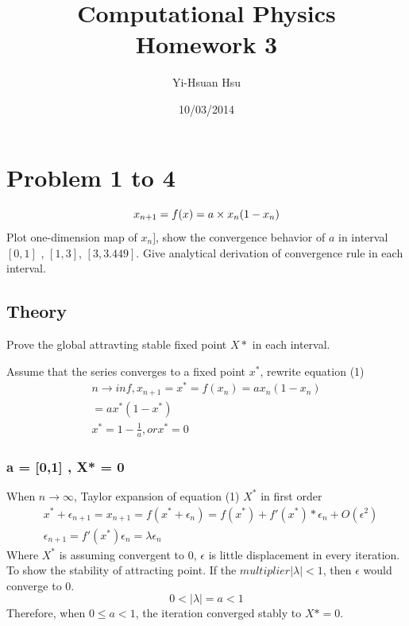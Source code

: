 \documentclass[12pt]{article}
\begin{document}
\title{Computational Physics \\ Homework 3}
\author{Yi-Hsuan Hsu}
\date{10/03/2014}
\maketitle

\section{Problem 1 to 4}
\begin{equation}
	x_{n+1}=f(x)=a\times x_{n}(1-x_{n})\\
\end{equation}
Plot one-dimension map of $x_{n}]$, show the convergence behavior of $a$ in interval $[0,1]$ , $[1,3]$, $[3,3.449]$. Give analytical derivation of convergence rule in each interval.

\subsection{Theory}
Prove the global attravting stable fixed point $X*$ in each interval.

Assume that the series converges to a fixed point $x^*$, rewrite equation (1)
\begin{eqnarray}
n\rightarrow inf, x_{n+1}=x^*=f(x_{n})=ax_{n}(1-x_{n})\\
=ax^*(1-x^*)\\
x^*=1-\frac{1}{a}, or x^*=0
\end{eqnarray}
\subsubsection{ a = [0,1] , X* = 0}

When $n\rightarrow\infty$, Taylor expansion of  equation (1) $X^{*}$ in first order 
\begin{eqnarray}
	&x^*+\epsilon_{n+1}=x_{n+1}=f(x^*+\epsilon_{n})=f(x^*)+f'(x^*)*\epsilon_{n}+O(\epsilon^2)\\
	&\epsilon_{n+1}=f'(x^*)\epsilon_{n}=\lambda\epsilon_{n}
\end{eqnarray}
Where $X^{*}$ is assuming convergent to 0, $\epsilon$ is little displacement in every iteration. To show the stability of attracting point. If the $multiplier |\lambda|<1$, then $\epsilon$ would converge to 0.
\begin{equation}
	0<|\lambda|=a<1
\end{equation}
Therefore, when $0\leq a <1$, the iteration converged stably to $X*=0$.
\end{document}
